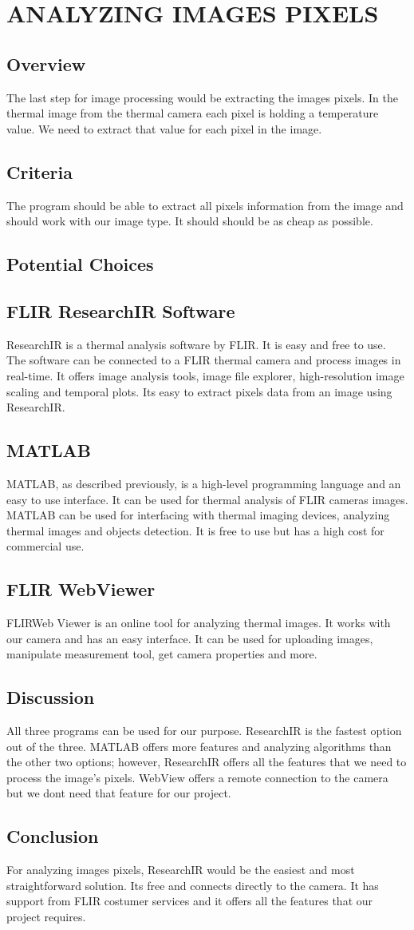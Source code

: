 \section*{ANALYZING IMAGES PIXELS}
	\subsection*{Overview}
	The last step for image processing would be extracting the images pixels. In the thermal image from the thermal camera
	each pixel is holding a temperature value. We need to extract that value for each pixel in the image.
	\subsection*{Criteria}
	The program should be able to extract all pixels information from the image and should work with our image type. It
	should should be as cheap as possible.
	\subsection*{Potential Choices}
	\subsection*{FLIR ResearchIR Software}
		ResearchIR is a thermal analysis software by FLIR. It is easy and free to use. The software can be connected to a FLIR
		thermal camera and process images in real-time. It offers image analysis tools, image file explorer, high-resolution image
		scaling and temporal plots. Its easy to extract pixels data from an image using ResearchIR.
	\subsection*{MATLAB}
	MATLAB, as described previously, is a high-level programming language and an easy to use interface. It can be used for
	thermal analysis of FLIR cameras images. MATLAB can be used for interfacing with thermal imaging devices, analyzing
	thermal images and objects detection. It is free to use but has a high cost for commercial use.
	\subsection*{FLIR WebViewer}
	FLIRWeb Viewer is an online tool for analyzing thermal images. It works with our camera and has an easy interface. It can be used for uploading images, manipulate measurement tool, get camera properties and more.
	\subsection*{Discussion}
	All three programs can be used for our purpose. ResearchIR is the fastest option out of the three. MATLAB offers more
	features and analyzing algorithms than the other two options; however, ResearchIR offers all the features that we need
	to process the image’s pixels. WebView offers a remote connection to the camera but we dont need that feature for our
	project.
	\subsection*{Conclusion}		
	For analyzing images pixels, ResearchIR would be the easiest and most straightforward solution. Its free and connects
	directly to the camera. It has support from FLIR costumer services and it offers all the features that our project requires.